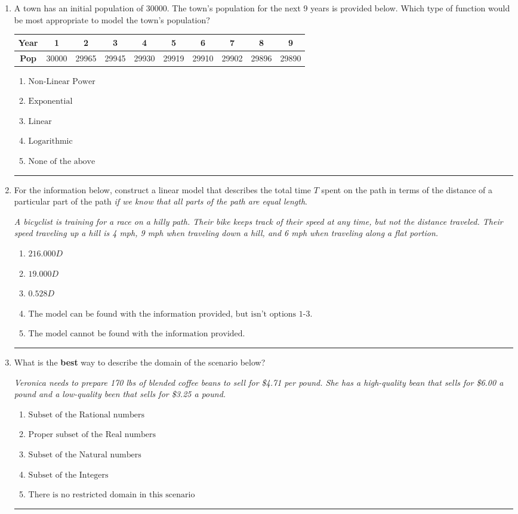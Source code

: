 \documentclass[14pt]{extbook}
\newcommand{\litem}[1]{\item#1\hspace*{-1cm}\rule{\textwidth}{0.4pt}}
\begin{document}
\begin{enumerate}
{\begin{enumerate}[label=\Alph*.]
\end{enumerate} }
\litem{
A town has an initial population of 30000. The town's population for the next 9 years is provided below. Which type of function would be most appropriate to model the town's population?

\begin{tabular}{c|c|c|c|c|c|c|c|c|c}
\textbf{Year} &1 &2 &3 &4 &5 &6 &7 &8 &9\tabularnewline \hline
\textbf{Pop} &30000 &29965 &29945 &29930 &29919 &29910 &29902 &29896 &29890\end{tabular}\begin{enumerate}[label=\Alph*.]
\item \( \text{Non-Linear Power} \)
\item \( \text{Exponential} \)
\item \( \text{Linear} \)
\item \( \text{Logarithmic} \)
\item \( \text{None of the above} \)

\end{enumerate} }
\litem{
For the information below, construct a linear model that describes the total time $T$ spent on the path in terms of the distance of a particular part of the path \textit{if we know that all parts of the path are equal length}.
\begin{center}
    \textit{ A bicyclist is training for a race on a hilly path. Their bike keeps track of their speed at any time, but not the distance traveled. Their speed traveling up a hill is 4 mph, 9 mph when traveling down a hill, and 6 mph when traveling along a flat portion. }
\end{center}
\begin{enumerate}[label=\Alph*.]
\item \( 216.000 D \)
\item \( 19.000 D \)
\item \( 0.528 D \)
\item \( \text{The model can be found with the information provided, but isn't options 1-3.} \)
\item \( \text{The model cannot be found with the information provided.} \)

\end{enumerate} }
\litem{
What is the \textbf{best} way to describe the domain of the scenario below?
\begin{center}
    \textit{ Veronica needs to prepare 170 lbs of blended coffee beans to sell for \$4.71 per pound. She has a high-quality bean that sells for \$6.00 a pound and a low-quality been that sells for \$3.25 a pound. }
\end{center}
\begin{enumerate}[label=\Alph*.]
\item \( \text{Subset of the Rational numbers} \)
\item \( \text{Proper subset of the Real numbers} \)
\item \( \text{Subset of the Natural numbers} \)
\item \( \text{Subset of the Integers} \)
\item \( \text{There is no restricted domain in this scenario} \)


\end{enumerate}}
\end{enumerate}
\end{document}
